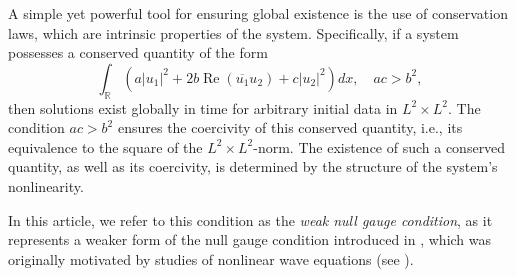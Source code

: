 \documentclass[11pt,a4paper,oneside]{amsart}
\theoremstyle{plain}
\theoremstyle{remark}
\numberwithin{equation}{section}
\renewcommand{\Re}{\operatorname{Re}}
\theoremstyle{definition}
\begin{document}
A simple yet powerful tool for ensuring global existence is the use of conservation laws, which are intrinsic properties of the system.
Specifically, if a system possesses a conserved quantity of the form
\begin{equation}\label{E:quadconserve}
\int_\mathbb{R} (a |u_1|^2 + 2b\Re (\overline{u_1}u_2) + c |u_2|^2)dx, \quad ac > b^2,
\end{equation}
then solutions exist globally in time for arbitrary initial data in $L^2 \times L^2$.
The condition $ac > b^2$ ensures the coercivity of this conserved quantity, i.e., its equivalence to the square of the $L^2 \times L^2$-norm.
The existence of such a conserved quantity, as well as its coercivity, is determined by the structure of the system's nonlinearity.

In this article, we refer to this condition as the \emph{weak null gauge condition}, as it represents a weaker form of the null gauge condition introduced in \cite{Tsu,KaTsu}, which was originally motivated by studies of nonlinear wave equations (see \cite{Ka}).
\end{document}

